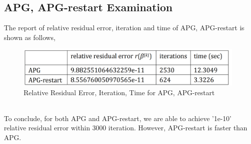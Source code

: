 \documentclass{article}
\begin{document}
\subsection{APG, APG-restart Examination}
The report of relative residual error, iteration and time of APG, APG-restart is shown as follows,
\begin{figure}[h]
	\centering
	\includegraphics[width=.35\textheight]{e.png}
	\caption{Relative Residual Error, Iteration, Time for APG, APG-restart}
	\label{fig:003}
\end{figure}
\\
To conclude, for both APG and APG-restart, we are able to achieve '1e-10' relative residual error within 3000 iteration. However, APG-restart is faster than APG.
\end{document}
